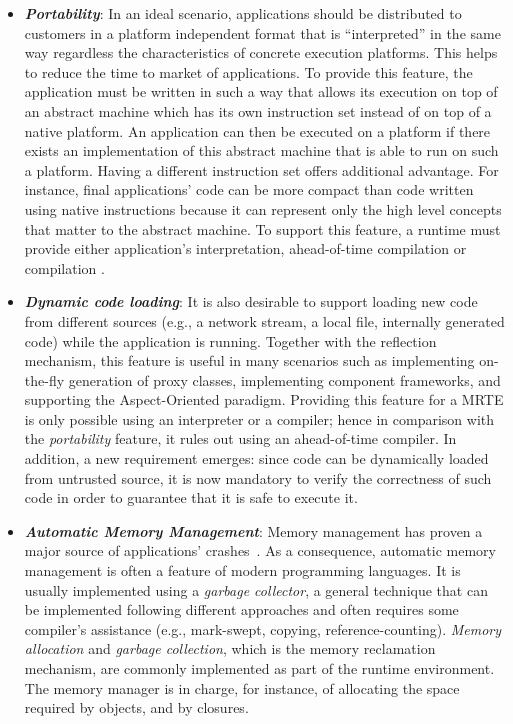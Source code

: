 \begin{itemize}
\item \textbf{\textit{Portability}}:
In an ideal scenario, applications should be distributed to customers in a platform independent format that is ``interpreted'' in the same way regardless the characteristics of concrete execution platforms.
This helps to reduce the time to market of applications.
To provide this feature, the application must be written in such a way that allows its execution on top of an abstract machine which has its own instruction set instead of on top of a native platform.
An application can then be executed on a platform if there exists an implementation of this abstract machine that is able to run on such a platform.
Having a different instruction set offers additional advantage.
For instance, final applications' code can be more compact than code written using native instructions because it can represent only the high level concepts that matter to the abstract machine.
To support this feature, a runtime must provide either application's interpretation, ahead-of-time compilation \cite{Muller:1997:HFE:1268028.1268029,Proebsting:1997:TJA:1268028.1268031,Wang:2011:MAC:2038698.2038704,Oh:2015:BAC:2757012.2757057} or  compilation \cite{Inoue:2012:AMC:2398857.2384630,Paleczny:2001:JHT:1267847.1267848,Grcevski:2004:JTJ:1267242.1267254}.

\item \textbf{\textit{Dynamic code loading}}:
It is also desirable to support loading new code from different sources (e.g., a network stream, a local file, internally generated code) while the application is running.
Together with the reflection mechanism, this feature is useful in many scenarios such as implementing on-the-fly generation of proxy classes, implementing component frameworks, and supporting the Aspect-Oriented paradigm.
Providing this feature for a MRTE is only possible using an interpreter or a  compiler; hence in comparison with the \textit{portability} feature, it rules out using an ahead-of-time compiler.
In addition, a new requirement emerges: since code can be dynamically loaded from untrusted source, it is now mandatory to verify the correctness of such code in order to guarantee that it is safe to execute it.  

\item \textbf{\textit{Automatic Memory Management}}: 
Memory management has proven a major source of applications' crashes~\cite{Novark:2008:EAC:1409360.1409382, Allevato:2009:DEP:1508865.1508928}.
As a consequence, automatic memory management is often a feature of modern programming languages.
It is usually implemented using a \textit{garbage collector}, a general technique that can be implemented following different approaches and often requires some compiler's assistance (e.g., mark-swept, copying, reference-counting).
\textit{Memory allocation} and \textit{garbage collection}, which is the memory reclamation mechanism, are commonly implemented as part of the runtime environment.
The memory manager is in charge, for instance, of allocating the space required by objects, and by closures.


\end{itemize}
